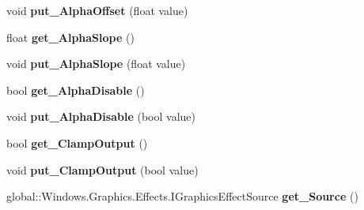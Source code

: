 \begin{DoxyCompactItemize}
void {\bfseries put\+\_\+\+Alpha\+Offset} (float value)
\item 
\mbox{\label{class_microsoft_1_1_graphics_1_1_canvas_1_1_effects_1_1_linear_transfer_effect_a0a474ad7b3976471579209c2ca2c12b4}} 
float {\bfseries get\+\_\+\+Alpha\+Slope} ()
\item 
\mbox{\label{class_microsoft_1_1_graphics_1_1_canvas_1_1_effects_1_1_linear_transfer_effect_a2de1e2340076a5720246eb8e51404f74}} 
void {\bfseries put\+\_\+\+Alpha\+Slope} (float value)
\item 
\mbox{\label{class_microsoft_1_1_graphics_1_1_canvas_1_1_effects_1_1_linear_transfer_effect_a927e3a0868674914e4559762049edeff}} 
bool {\bfseries get\+\_\+\+Alpha\+Disable} ()
\item 
\mbox{\label{class_microsoft_1_1_graphics_1_1_canvas_1_1_effects_1_1_linear_transfer_effect_a652ca7e49961cec56a8e9cdffc0e647c}} 
void {\bfseries put\+\_\+\+Alpha\+Disable} (bool value)
\item 
\mbox{\label{class_microsoft_1_1_graphics_1_1_canvas_1_1_effects_1_1_linear_transfer_effect_af99a192609cbc8a5e3567a286dd2fdf8}} 
bool {\bfseries get\+\_\+\+Clamp\+Output} ()
\item 
\mbox{\label{class_microsoft_1_1_graphics_1_1_canvas_1_1_effects_1_1_linear_transfer_effect_a37d74d7e18b00ba5a5091ee75f369f63}} 
void {\bfseries put\+\_\+\+Clamp\+Output} (bool value)
\item 
\mbox{\label{class_microsoft_1_1_graphics_1_1_canvas_1_1_effects_1_1_linear_transfer_effect_a150d940d9e3782329842305e98b627ca}} 
global\+::\+Windows.\+Graphics.\+Effects.\+I\+Graphics\+Effect\+Source {\bfseries get\+\_\+\+Source} ()
\item 

\end{DoxyCompactItemize}
